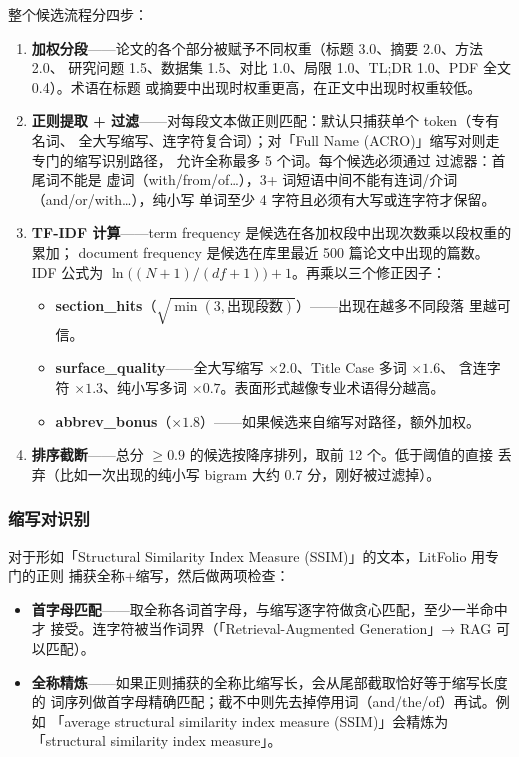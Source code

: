 整个候选流程分四步：

\begin{enumerate}
  \item \textbf{加权分段}——论文的各个部分被赋予不同权重（标题 3.0、摘要 2.0、方法 2.0、
    研究问题 1.5、数据集 1.5、对比 1.0、局限 1.0、TL;DR 1.0、PDF 全文 0.4）。术语在标题
    或摘要中出现时权重更高，在正文中出现时权重较低。
  \item \textbf{正则提取 + 过滤}——对每段文本做正则匹配：默认只捕获单个 token（专有名词、
    全大写缩写、连字符复合词）；对「Full Name (ACRO)」缩写对则走专门的缩写识别路径，
    允许全称最多 5 个词。每个候选必须通过  过滤器：首尾词不能是
    虚词（with/from/of\ldots），3+ 词短语中间不能有连词/介词（and/or/with\ldots），纯小写
    单词至少 4 字符且必须有大写或连字符才保留。
  \item \textbf{TF-IDF 计算}——term frequency 是候选在各加权段中出现次数乘以段权重的累加；
    document frequency 是候选在库里最近 500 篇论文中出现的篇数。IDF 公式为
    $\ln\!\bigl((N+1)/(df+1)\bigr) + 1$。再乘以三个修正因子：
    \begin{itemize}
      \item \textbf{section\_hits}（$\sqrt{\min(3, \text{出现段数})}$）——出现在越多不同段落
        里越可信。
      \item \textbf{surface\_quality}——全大写缩写 $\times 2.0$、Title Case 多词 $\times 1.6$、
        含连字符 $\times 1.3$、纯小写多词 $\times 0.7$。表面形式越像专业术语得分越高。
      \item \textbf{abbrev\_bonus}（$\times 1.8$）——如果候选来自缩写对路径，额外加权。
    \end{itemize}
  \item \textbf{排序截断}——总分 $\geq 0.9$ 的候选按降序排列，取前 12 个。低于阈值的直接
    丢弃（比如一次出现的纯小写 bigram 大约 0.7 分，刚好被过滤掉）。
\end{enumerate}

\subsubsection{缩写对识别}

对于形如「Structural Similarity Index Measure (SSIM)」的文本，LitFolio 用专门的正则
捕获全称+缩写，然后做两项检查：

\begin{itemize}
  \item \textbf{首字母匹配}——取全称各词首字母，与缩写逐字符做贪心匹配，至少一半命中才
    接受。连字符被当作词界（「Retrieval-Augmented Generation」→ RAG 可以匹配）。
  \item \textbf{全称精炼}——如果正则捕获的全称比缩写长，会从尾部截取恰好等于缩写长度的
    词序列做首字母精确匹配；截不中则先去掉停用词（and/the/of）再试。例如
    「average structural similarity index measure (SSIM)」会精炼为
    「structural similarity index measure」。
\end{itemize}

